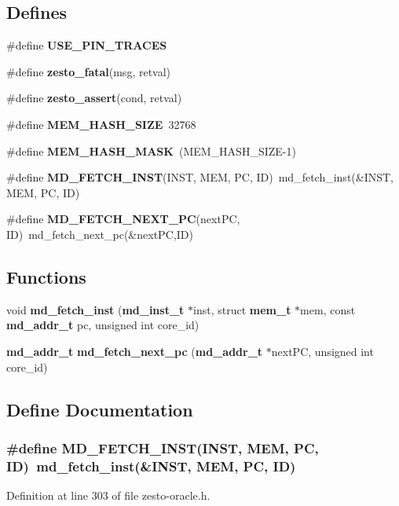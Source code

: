 \subsection*{Defines}
\begin{CompactItemize}
\item 
\#define {\bf USE\_\-PIN\_\-TRACES}
\item 
\#define {\bf zesto\_\-fatal}(msg, retval)
\item 
\#define {\bf zesto\_\-assert}(cond, retval)
\item 
\#define {\bf MEM\_\-HASH\_\-SIZE}~32768
\item 
\#define {\bf MEM\_\-HASH\_\-MASK}~(MEM\_\-HASH\_\-SIZE-1)
\item 
\#define {\bf MD\_\-FETCH\_\-INST}(INST, MEM, PC, ID)~md\_\-fetch\_\-inst(\&INST, MEM, PC, ID)
\item 
\#define {\bf MD\_\-FETCH\_\-NEXT\_\-PC}(nextPC, ID)~md\_\-fetch\_\-next\_\-pc(\&nextPC,ID)
\end{CompactItemize}
\subsection*{Functions}
\begin{CompactItemize}
\item 
void {\bf md\_\-fetch\_\-inst} ({\bf md\_\-inst\_\-t} $\ast$inst, struct {\bf mem\_\-t} $\ast$mem, const {\bf md\_\-addr\_\-t} pc, unsigned int core\_\-id)
\item 
{\bf md\_\-addr\_\-t} {\bf md\_\-fetch\_\-next\_\-pc} ({\bf md\_\-addr\_\-t} $\ast$nextPC, unsigned int core\_\-id)
\end{CompactItemize}


\subsection{Define Documentation}
\subsubsection[{MD\_\-FETCH\_\-INST}]{\setlength{\rightskip}{0pt plus 5cm}\#define MD\_\-FETCH\_\-INST(INST, \/  MEM, \/  PC, \/  ID)~md\_\-fetch\_\-inst(\&INST, MEM, PC, ID)}\label{zesto-oracle_8h_465a782fc5c7f5e58a637011cd6c26ed}




Definition at line 303 of file zesto-oracle.h.

